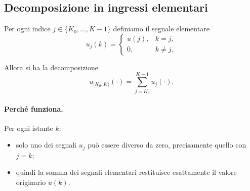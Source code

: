 \subsection{Decomposizione in ingressi elementari}

Per ogni indice $j\in\{K_0,\dots,K-1\}$ definiamo il segnale elementare
\[
u_j(k)=
\begin{cases}
u(j), & k=j,\\[4pt]
0, & k\neq j.
\end{cases}
\]

Allora si ha la decomposizione
\begin{equation}
u_{[K_0,K)}(\cdot)=\sum_{j=K_0}^{K-1}u_j(\cdot).
\label{eq:L3_input_decomposition}
\end{equation}

\paragraph{Perché funziona.}
Per ogni istante $k$:
\begin{itemize}
    \item solo uno dei segnali $u_j$ può essere diverso da zero, precisamente quello con $j=k$;
    \item quindi la somma dei segnali elementari restituisce esattamente il valore originario $u(k)$.
\end{itemize}

